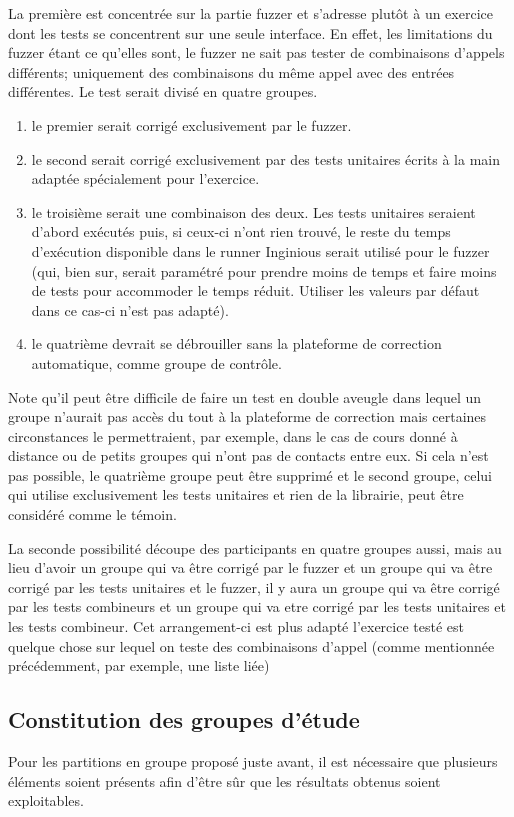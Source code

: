 \documentclass[a4paper]{report}
\begin{document}
La première est concentrée sur la partie fuzzer et s'adresse plutôt à un exercice dont les tests se concentrent sur une seule interface.
En effet, les limitations du fuzzer étant ce qu'elles sont, le fuzzer ne sait pas tester de combinaisons d'appels différents; uniquement des combinaisons du même appel avec des entrées différentes.
Le test serait divisé en quatre groupes.
\begin{enumerate}
\item le premier serait corrigé exclusivement par le fuzzer.
\item le second serait corrigé exclusivement par des tests unitaires écrits à la main adaptée spécialement pour l'exercice.
\item le troisième serait une combinaison des deux. Les tests unitaires seraient d'abord exécutés puis, si ceux-ci n'ont rien trouvé, le reste du temps d'exécution disponible dans le runner Inginious serait utilisé pour le fuzzer (qui, bien sur, serait paramétré pour prendre moins de temps et faire moins de tests pour accommoder le temps réduit. Utiliser les valeurs par défaut dans ce cas-ci n'est pas adapté).
\item le quatrième  devrait se débrouiller sans la plateforme de correction automatique, comme groupe de contrôle.
\end{enumerate}
Note qu'il peut être difficile de faire un test en double aveugle dans lequel un groupe n'aurait pas accès du tout à la plateforme de correction mais certaines circonstances le permettraient, par exemple, dans le cas de cours donné à distance ou de petits groupes qui n'ont pas de contacts entre eux.
Si cela n'est pas possible, le quatrième groupe peut être supprimé et le second groupe, celui qui utilise exclusivement les tests unitaires et rien de la librairie, peut être considéré comme le témoin.

La seconde possibilité découpe des participants en quatre groupes aussi, mais au lieu d'avoir un groupe qui va être corrigé par le fuzzer et un groupe qui va être corrigé par les tests unitaires et le fuzzer,  il y aura un groupe qui va être corrigé par les tests combineurs et un groupe  qui va etre corrigé par les tests unitaires et les tests combineur.
Cet arrangement-ci est plus adapté l'exercice testé est quelque chose sur lequel on teste des combinaisons d'appel (comme mentionnée précédemment, par exemple, une liste liée)

\subsection{Constitution des groupes d'étude}
Pour les partitions en groupe proposé juste avant, il est nécessaire que plusieurs éléments soient présents afin d'être sûr que les résultats obtenus soient exploitables.
\end{document}
